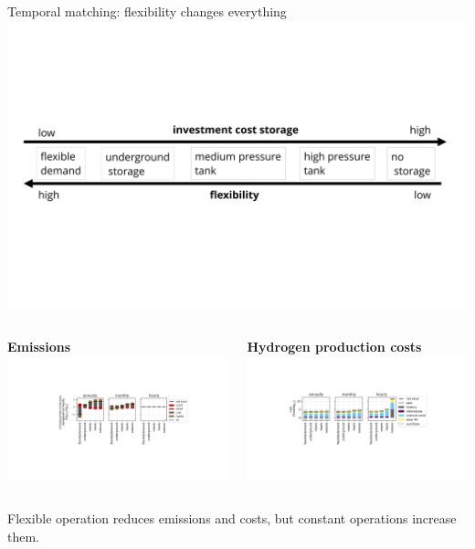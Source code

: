 \begin{frame}{Temporal matching: flexibility changes everything}
	\centering
	\includegraphics[width=0.6\linewidth, clip, trim={0cm 5cm 0cm 5cm}]{images/store_flexibility_v2}
	\begin{columns}[t]
		\begin{column}{0.5\textwidth}
			  	\centering
			\textbf{Emissions} \\
  	\includegraphics[width=1\linewidth, clip, trim={5cm 4cm 5cm 4cm}]{images/emissions_flexibility}
  	\end{column}
\begin{column}{0.5\textwidth}
		\centering
	\textbf{Hydrogen production costs} \\
	\includegraphics[width=1\linewidth, clip, trim={5cm 4cm 5cm 4cm}]{images/costs_flexibility}
\end{column}
\end{columns}
	\centering
    \alert{Flexible} operation \alert{reduces} emissions and costs, but \alert{constant} operations \alert{increase} them.
    

\end{frame}


